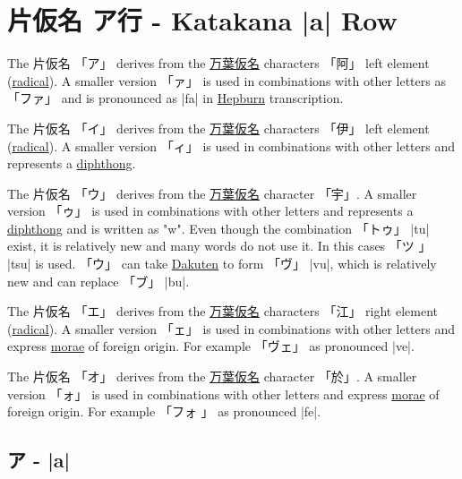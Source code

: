 \section{片仮名 ア行 - Katakana |a| Row}  \label{sec:KatakanaARow}


\label{letter:a} The 片仮名 {「ア」} derives from the
\hyperref[sec:Manyogana]{万葉仮名} characters {「阿」} left element
(\hyperref[sec:Radical]{radical}).  A smaller version {「ァ」} is used in
combinations with other letters as {「ファ」} and is pronounced as |fa| in
\hyperref[sec:Hepburn]{Hepburn} transcription.

\label{letter:u} The 片仮名 {「イ」} derives from the
\hyperref[sec:Manyogana]{万葉仮名} characters {「伊」} left element
(\hyperref[sec:Radical]{radical}).  A smaller version {「ィ」} is used in
combinations with other letters and represents a
\hyperref[sec:Diphthong]{diphthong}. 

\label{letter:u} The 片仮名 {「ウ」} derives from the
\hyperref[sec:Manyogana]{万葉仮名} character {「宇」}. A smaller version
{「ゥ」} is used in combinations with other letters and represents a
\hyperref[sec:Diphthong]{diphthong} and is written as "w". Even though the
combination {「トゥ」} |tu| exist, it is relatively new and many words do not
use it. In this cases {「ツ 」} |tsu| is used. {「ウ」} can take
\hyperref[sec:Dakuten]{Dakuten} to form {「ヴ」} |vu|, which is relatively new
and can replace {「ブ」} |bu|. 



\newpage 

\label{letter:e} The 片仮名 {「エ」} derives from the
\hyperref[sec:Manyogana]{万葉仮名} characters {「江」} right element
(\hyperref[sec:Radical]{radical}). A smaller version {「ェ」} is used in
combinations with other letters and express \hyperref[sec:Mora]{morae} of
foreign origin. For example {「ヴェ」} as pronounced |ve|.

\label{letter:o} The 片仮名 {「オ」} derives from the
\hyperref[sec:Manyogana]{万葉仮名} character {「於」}. A smaller version
{「ォ」} is used in combinations with other letters and express
\hyperref[sec:Mora]{morae} of foreign origin. For example {「フォ 」} as
pronounced |fe|.

\newpage


\subsection{ア - |a|} \label{sec:KatakanaA}

